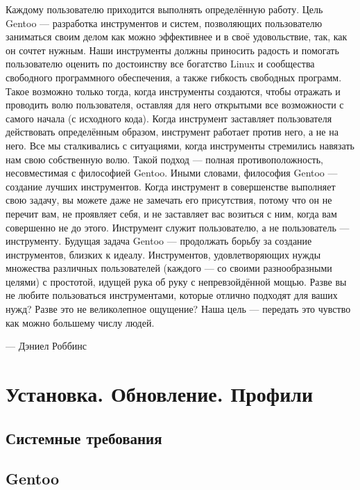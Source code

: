 \documentclass[10pt, a4paper]{article}
\begin{document}
Каждому пользователю приходится выполнять определённую работу. Цель Gentoo — разработка инструментов и систем, позволяющих пользователю заниматься своим делом как можно эффективнее и в своё удовольствие, так, как он сочтет нужным. Наши инструменты должны приносить радость и помогать пользователю оценить по достоинству все богатство Linux и сообщества свободного программного обеспечения, а также гибкость свободных программ. Такое возможно только тогда, когда инструменты создаются, чтобы отражать и проводить волю пользователя, оставляя для него открытыми все возможности с самого начала (с исходного кода). Когда инструмент заставляет пользователя действовать определённым образом, инструмент работает против него, а не на него. Все мы сталкивались с ситуациями, когда инструменты стремились навязать нам свою собственную волю. Такой подход — полная противоположность, несовместимая с философией Gentoo.
Иными словами, философия Gentoo — создание лучших инструментов. Когда инструмент в совершенстве выполняет свою задачу, вы можете даже не замечать его присутствия, потому что он не перечит вам, не проявляет себя, и не заставляет вас возиться с ним, когда вам совершенно не до этого. Инструмент служит пользователю, а не пользователь — инструменту.
Будущая задача Gentoo — продолжать борьбу за создание инструментов, близких к идеалу. Инструментов, удовлетворяющих нужды множества различных пользователей (каждого — со своими разнообразными целями) с простотой, идущей рука об руку с непревзойдённой мощью. Разве вы не любите пользоваться инструментами, которые отлично подходят для ваших нужд? Разве это не великолепное ощущение? Наша цель — передать это чувство как можно большему числу людей.
\newline
\begin{flushright}
— Дэниел Роббинс
\end{flushright}

\newpage

\section{Установка. Обновление. Профили}

\subsection{Системные требования}
\subsection{Gentoo}
\end{document}
